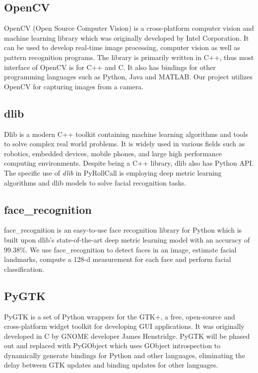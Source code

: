 
\subsection{OpenCV}  %
OpenCV (Open Source Computer Vision) is a cross-platform computer vision and machine learning library which was
originally developed by Intel Corporation. It can be used to develop real-time image processing, computer vision
as well as pattern recognition programs. The library is primarily written in C++, thus most interface of
OpenCV is for C++ and C. It also has bindings for other programming languages such as Python, Java and MATLAB.
Our project utilizes OpenCV for capturing images from a camera.

\subsection{dlib}  %
Dlib is a modern C++ toolkit containing machine learning algorithms and tools to solve complex real world problems.
It is widely used in various fields such as robotics, embedded devices, mobile phones, and large high performance
computing environments. Despite being a C++ library, dlib also has Python API. The specific use of \emph{dlib}
in PyRollCall is employing deep metric learning algorithms and dlib models to solve facial recognition tasks.

\subsection{face\_recognition}  %
face\_recognition is an easy-to-use face recognition library for Python which is built upon dlib's state-of-the-art
deep metric learning model with an accuracy of 99.38\%. We use face\_recognition to detect faces in an image,
estimate facial landmarks, compute a 128-d measurement for each face and perform facial classification.

\subsection{PyGTK}  %
PyGTK is a set of Python wrappers for the GTK+, a free, open-source and cross-platform widget toolkit for
developing GUI applications. It was originally developed in C by GNOME developer James Henstridge.
PyGTK will be phased out and replaced with PyGObject which uses GObject introspection to dynamically generate
bindings for Python and other languages, eliminating the delay between GTK updates and binding updates for
other languages.
